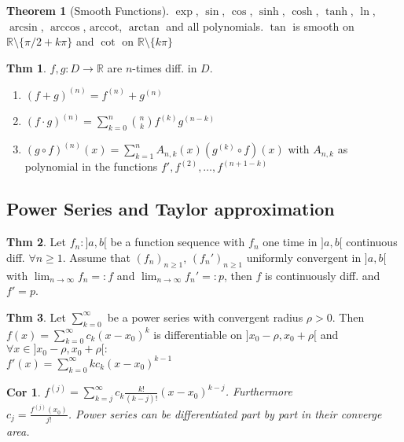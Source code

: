 \documentclass[a4paper, 10pt]{article}
\newtheorem*{corollary}{Cor}
\theoremstyle{definition}
\newtheorem*{theorem}{Thm}
\theoremstyle{named}
\newtheorem*{ntheorem_wrapper}{Theorem}
\newenvironment{ntheorem}%
    {\begin{mdframed}[style=important]\begin{ntheorem_wrapper}}%
    {\end{ntheorem_wrapper}\end{mdframed}}
\newcommand{\R}{\mathbb{R}}
\begin{document}
\begin{ntheorem}[Smooth Functions]
    $\exp$, $\sin$, $\cos$, $\sinh$, $\cosh$, $\tanh$, $\ln$, $\arcsin$, $\arccos$, $\text{arccot}$, $\arctan$ and all polynomials. $\tan$ is smooth on $\R \setminus \{\pi / 2 + k \pi\}$ and $\cot$ on $\R \setminus\{k\pi\}$
\end{ntheorem}

\begin{theorem}
    $f, g: D \to \R$ are $n$-times diff. in $D$.
    \begin{enumerate}
        \item $(f + g)^{(n)} = f^{(n)} + g^{(n)}$
        \item $(f \cdot g)^{(n)} = \sum_{k = 0}^n \binom{n}{k}f^{(k)}g^{(n-k)}$
        \item $(g \circ f)^{(n)}(x) = \sum_{k=1}^n A_{n,k}(x)(g^{(k)} \circ f)(x)$ with $A_{n,k}$ as polynomial in the functions $f', f^{(2)}, \ldots, f^{(n+1-k)}$
    \end{enumerate}
\end{theorem}

\subsection{Power Series and Taylor approximation}
\begin{theorem}
    Let $f_n : ]a, b[$ be a function sequence with $f_n$ one time in $]a, b[$ continuous diff. $\forall n \geq 1$. Assume that $(f_n)_{n \geq 1}$, $(f_n')_{n \geq 1}$ uniformly convergent in $]a, b[$ with $\lim_{n \to \infty} f_n =: f$ and $\lim_{n \to \infty} f_n' =: p$, then $f$ is continuously diff. and $f' = p$.
\end{theorem}

\begin{theorem}
    Let $\sum_{k = 0}^\infty$ be a power series with convergent radius $\rho > 0$. Then $f(x) = \sum_{k = 0}^\infty c_k(x - x_0)^k$ is differentiable on $]x_0 - \rho , x_0 + \rho[$ and $\forall x \in ]x_0 - \rho , x_0 + \rho[:$ \\
    $f'(x) = \sum_{k = 0}^\infty kc_k(x - x_0)^{k - 1}$
\end{theorem}

\begin{corollary}
    $f^{(j)} = \sum_{k = j}^\infty c_k \frac{k!}{(k-j)!}(x - x_0)^{k - j}$. Furthermore \\ $c_j = \frac{f^{(j)}(x_0)}{j!}$. Power series can be differentiated part by part in their converge area.
\end{corollary}
\end{document}
